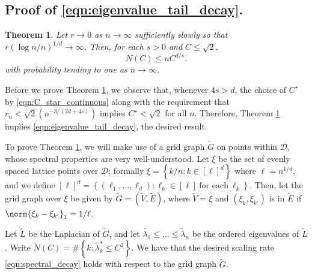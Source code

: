 \documentclass{article}
\newcommand{\set}[1]{\left\{#1\right\}}
\newcommand{\1}{\mathbf{1}}
\newcommand{\wt}[1]{\widetilde{#1}}
\theoremstyle{alden}
\theoremstyle{aldenthm}
\newtheorem{theorem}{Theorem}
\theoremstyle{definition}
\theoremstyle{remark}
\begin{document}
\subsection{Proof of \eqref{eqn:eigenvalue_tail_decay}.}

\begin{theorem}
	\label{thm:spectral_decay}
	Let $r \to 0$ as $n \to \infty$ sufficiently slowly so that $r(\log n/n)^{1/d} \to \infty$. Then, for each $s > 0$ and $C \leq \sqrt{2}$,
	\begin{equation}
	\label{eqn:spectral_decay}
	N(C) \leq n C^{d/s}.
	\end{equation} 
	with probability tending to one as $n \to \infty$. 
\end{theorem}

Before we prove Theorem \ref{thm:spectral_decay}, we observe that, whenever $4s > d$, the choice of $C^{\star}$ by \eqref{eqn:C_star_continuous} along with the requirement that $r_n < \sqrt{2}(n^{-3/(2d + 4s)})$ implies $C^{\star} < \sqrt{2}$ for all $n$. Therefore, Theorem \ref{thm:spectral_decay} implies \eqref{eqn:eigenvalue_tail_decay}, the desired result.

To prove Theorem \ref{thm:spectral_decay}, we will make use of a grid graph $\widetilde{G}$ on points within $\mathcal{D}$, whose spectral properties are very well-understood. Let $\xi$ be the set of evenly spaced lattice points over $\mathcal{D}$; formally $\xi = \set{k/n: k \in [\ell]^d}$ where $\ell = n^{1/d}$, and we define $[\ell]^d = \set{(\ell_1,\ldots,\ell_d): \ell_k \in [\ell] ~\textrm{for each}~ \ell_k}$. Then, let the grid graph over $\xi$ be given by $\wt{G} = (\wt{V},\wt{E})$, where $\wt{V} = \xi$ and $(\xi_k, \xi_{k'})$ is in $\wt{E}$ if $\norm{\xi_k - \xi_{k'}}_1 = 1/\ell$.  

Let $\wt{L}$ be the Laplacian of $\wt{G}$, and let $\wt{\lambda_1} \leq \ldots \leq \wt{\lambda}_n$ be the ordered eigenvalues of $\wt{L}$. Write $\wt{N}(C) = \#\set{k: \wt{\lambda}_k^s \leq C^2}$. We have that the desired scaling rate \eqref{eqn:spectral_decay} holds with respect to the grid graph $\wt{G}$. 
\end{document}
